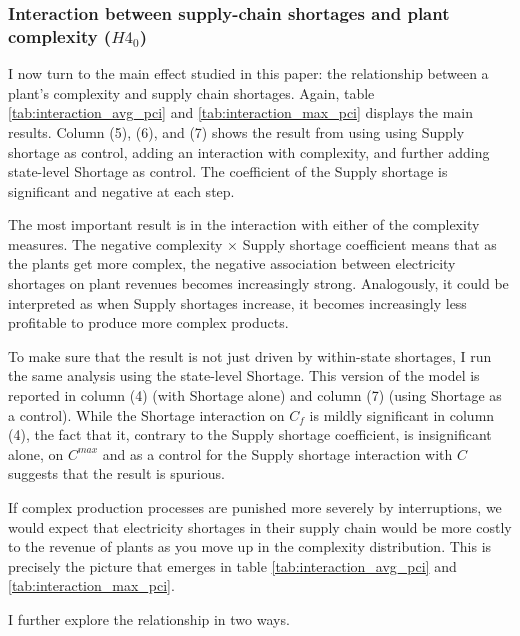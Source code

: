 \documentclass[11pt]{article}
\begin{document}
\subsubsection{Interaction between supply-chain shortages and plant complexity ($H4_0$)}

I now turn to the main effect studied in this paper: the relationship between a plant's complexity and supply chain shortages. Again, table \ref{tab:interaction_avg_pci} and \ref{tab:interaction_max_pci} displays the main results. Column (5), (6), and (7) shows the result from using using Supply shortage as control, adding an interaction with complexity, and further adding state-level Shortage as control. The coefficient of the Supply shortage is significant and negative at each step. 

The most important result is in the interaction with either of the complexity measures. The negative complexity $\times$ Supply shortage coefficient means that as the plants get more complex, the negative association between electricity shortages on plant revenues becomes increasingly strong. Analogously, it could be interpreted as when Supply shortages increase, it becomes increasingly less profitable to produce more complex products.

To make sure that the result is not just driven by within-state shortages, I run the same analysis using the state-level Shortage. This version of the model is reported in column (4) (with Shortage alone) and column (7) (using Shortage as a control). While the Shortage interaction on $C_f$ is mildly significant in column (4), the fact that it, contrary to the Supply shortage coefficient, is insignificant alone, on $C^{max}$ and as a control for the Supply shortage interaction with $C$ suggests that the result is spurious. 

If complex production processes are punished more severely by interruptions, we would expect that electricity shortages in their supply chain would be more costly to the revenue of plants as you move up in the complexity distribution. This is precisely the picture that emerges in table \ref{tab:interaction_avg_pci} and \ref{tab:interaction_max_pci}.  

I further explore the relationship in two ways.
\end{document}
